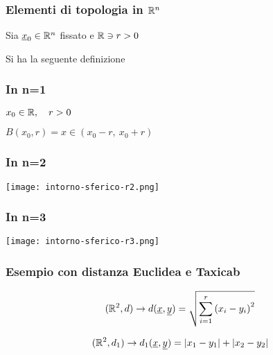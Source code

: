 \pagebreak{}

\subsubsection{Elementi di topologia in \texorpdfstring{\(\mathbb{R}^{n} \)}{Rn}}

Sia \(\underline{x}_0 \in \mathbb{R}^{n} \) fissato e \(\mathbb{R} \ni r>0\)

Si ha la seguente definizione


\subsubsection*{In n=1}

\(x_0 \in \mathbb{R}, \quad r > 0\)

\(B(x_{0},r) = x \in \left( x_0-r,\ x_0+r \right)\)

\subsubsection*{In n=2}

\begin{center}
    \texttt{[image: intorno-sferico-r2.png]}
\end{center}

\subsubsection*{In n=3}

\begin{center}
    \texttt{[image: intorno-sferico-r3.png]}
\end{center}

\filbreak{}

\subsubsection*{Esempio con distanza Euclidea e Taxicab}

\[
    (\mathbb{R}^{2},d) \rightarrow d(\underline{x},\underline{y}) = \sqrt{\sum^{r}_{i=1} {(x_i-y_i)}^2}
\]

\[
    (\mathbb{R}^{2},d_1) \rightarrow d_1(\underline{x},\underline{y}) = |x_1-y_1| + |x_2-y_2|
\]

